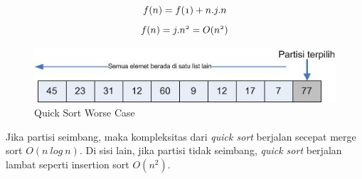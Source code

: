 $$ \mathnormal{f(n) = f(1) + n.j.n} $$
$$ \mathnormal{f(n) = j.n^{2} = O(n^{2})} $$
		

\begin{figure}[htbp]
\begin{center}
	\includegraphics[scale=0.5]{fig/sunario-3/QuickSort3.jpg}%
	\caption{Quick Sort Worse Case}%
	\label{fig:WorseCaseQuickSort}%
\end{center}
\end{figure}


Jika partisi seimbang, maka kompleksitas dari  \textit{quick sort} berjalan secepat merge sort $O(n\ log\ n)$. Di sisi lain, jika partisi tidak seimbang, \textit{quick sort} berjalan lambat seperti insertion sort $O(n^{2})$.